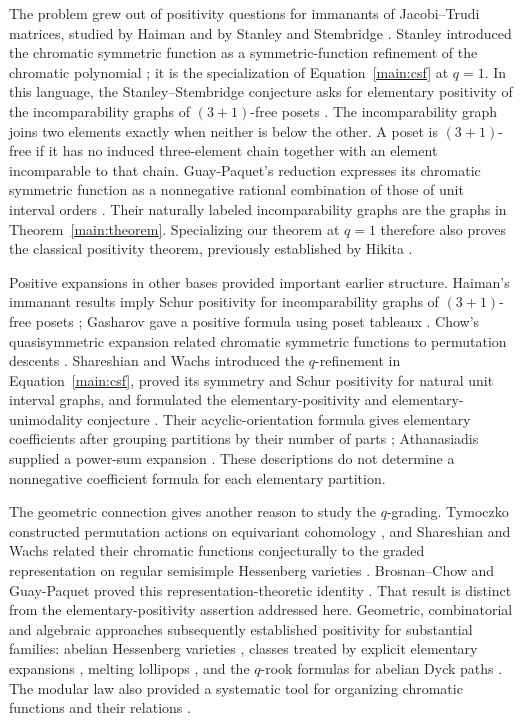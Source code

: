 The problem grew out of positivity questions for immanants of
Jacobi--Trudi matrices, studied by Haiman and by Stanley and Stembridge
\cite{Hai93,SS93}.  Stanley introduced the chromatic symmetric function
as a symmetric-function refinement of the chromatic polynomial
\cite{Sta95}; it is the specialization of
Equation~\eqref{main:csf} at $q=1$.  In this language, the
Stanley--Stembridge conjecture asks for elementary positivity of the
incomparability graphs of $(3+1)$-free posets
\cite[Conjecture~5.5]{SS93}. The incomparability graph joins two
elements exactly when neither is below the other. A poset is
$(3+1)$-free if it has no induced three-element chain together with
an element incomparable to that chain.
Guay-Paquet's reduction expresses its chromatic symmetric function as
a nonnegative rational combination of those of unit interval orders
\cite[Theorem~5.1]{GP13}. Their naturally labeled incomparability
graphs are the graphs in Theorem~\ref{main:theorem}. Specializing our
theorem at $q=1$ therefore also proves the classical positivity
theorem, previously established by Hikita \cite{Hik24}.

Positive expansions in other bases provided important earlier
structure. Haiman's immanant results imply Schur positivity for
incomparability graphs of $(3+1)$-free posets \cite{Hai93}; Gasharov
gave a positive formula using poset tableaux \cite{Gas96}. Chow's
quasisymmetric expansion related chromatic symmetric functions to
permutation descents \cite{Cho99}.  Shareshian and Wachs introduced the
$q$-refinement in Equation~\eqref{main:csf}, proved its symmetry and
Schur positivity for natural unit interval graphs, and formulated the
elementary-positivity and elementary-unimodality conjecture
\cite{SW12,SW16}.  Their acyclic-orientation formula gives elementary
coefficients after grouping partitions by their number of parts
\cite[Theorem~5.3]{SW16}; Athanasiadis supplied a power-sum expansion
\cite{Ath15}.  These descriptions do not determine a nonnegative
coefficient formula for each elementary partition.

The geometric connection gives another reason to study the
$q$-grading.  Tymoczko constructed permutation actions on equivariant
cohomology \cite{Tym08}, and Shareshian and Wachs related their
chromatic functions conjecturally to the graded representation on
regular semisimple Hessenberg varieties \cite{SW12,SW16}.
Brosnan--Chow and Guay-Paquet proved this representation-theoretic
identity \cite{BC18,GP16}.  That result is distinct from the
elementary-positivity assertion addressed here.  Geometric,
combinatorial and algebraic approaches subsequently established
positivity for substantial families: abelian Hessenberg varieties
\cite{HP19}, classes treated by explicit elementary expansions
\cite{CH19}, melting lollipops \cite{HNY20}, and the $q$-rook
formulas for abelian Dyck paths \cite{CMP23}.  The modular law also
provided a systematic tool for organizing chromatic functions and
their relations \cite{AN21}.


